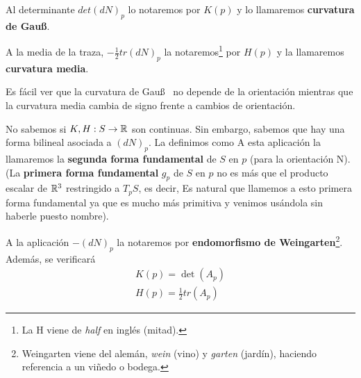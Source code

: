\begin{definicion}
    Al determinante $det(dN)_p$ lo notaremos por $K(p)$ y lo llamaremos \textbf{curvatura de Gau\ss}.
\end{definicion}
\begin{definicion}
    A la media de la traza, $-\frac{1}{2}tr(dN)_p$ la notaremos\footnote{La H viene de \textit{half} en inglés (mitad).} por $H(p)$ y la llamaremos \textbf{curvatura media}.
\end{definicion}
\begin{notacion}
    Es fácil ver que la curvatura de Gau\ss~ no depende de la orientación mientras que la curvatura media cambia de signo frente a cambios de orientación.
\end{notacion}

\begin{observacion}
    No sabemos si $K,H:S\to \mathbb{R}$ son continuas. Sin embargo, sabemos que hay una forma bilineal asociada a $(dN)_p$. La definimos como 
    A esta aplicación la llamaremos la \textbf{segunda forma fundamental} de $S$ en $p$ (para la orientación N).\\

    (La \textbf{primera forma fundamental} $g_p$ de $S$ en $p$ no es más que el producto escalar de $\mathbb{R}^3$ restringido a $T_pS$, es decir, 
    Es natural que llamemos a esto primera forma fundamental ya que es mucho más primitiva y venimos usándola sin haberle puesto nombre).
\end{observacion}

\begin{definicion}
    A la aplicación $-(dN)_p$ la notaremos por \textbf{endomorfismo de Weingarten}\footnote{Weingarten viene del alemán, \textit{wein} (vino) y \textit{garten} (jardín), haciendo referencia a un viñedo o bodega.}. Además, se verificará
    \begin{gather*}
        K(p) = \det(A_p)\\
        H(p) = \frac{1}{2}tr(A_p)
    \end{gather*}
\end{definicion}

